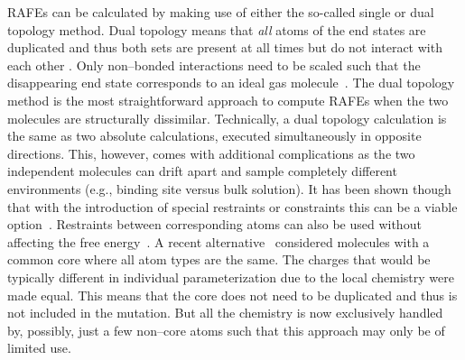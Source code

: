 \documentclass[journal=jctcce,manuscript=article]{achemso}
\begin{document}
RAFEs can be calculated by making use of either the so-called single or dual topology method.
Dual topology means that \emph{all} 
atoms of the end states are duplicated and thus both sets are present at all
times but do not interact with each other \cite{doi:10.1021/j100056a020, doi:10.1021/jp981628n}.  Only non--bonded
interactions need to be scaled such that the disappearing end state
corresponds to an ideal gas molecule~\cite{doi:10.1021/jp981628n}.
The dual topology method is the most straightforward approach to compute RAFEs when the two molecules are structurally dissimilar.
Technically, a dual topology calculation is the same as two absolute calculations, executed simultaneously in opposite directions.  
This, however, comes with additional complications as the two independent
molecules can drift apart and sample completely different environments (e.g., binding site versus bulk solution).
It has been shown though that with the introduction of 
special restraints or constraints this can be a viable 
option~\cite{doi:10.1021/ct700081t,  rocklin_separated_2013, JCC:Axelsen-Li}.  
Restraints between corresponding atoms can also be used without affecting the free 
energy~\cite{JCC:Axelsen-Li}.  A recent 
alternative~\cite{doi:10.1021/acs.jctc.5b00179} considered molecules with a
common core where all atom types are the same.  The charges that would be 
typically different in individual parameterization due to the local chemistry
were made equal.  This means that the core does not need to be duplicated and 
thus is not included in the mutation.  But all the chemistry is now exclusively 
handled by, possibly, just a few non--core atoms such that this approach may 
only be of limited use.
\end{document}
